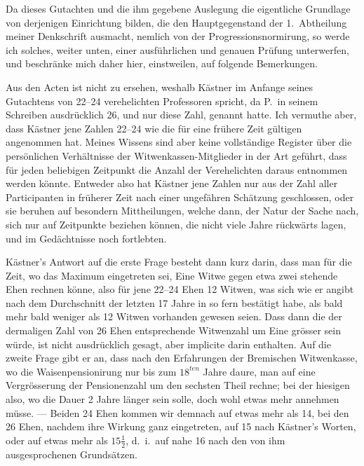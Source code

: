 \documentclass[12pt,a4paper]{article}
\begin{document}
Da dieses Gutachten und die ihm gegebene Auslegung die eigentliche Grundlage von derjenigen Einrichtung bilden, die den Hauptgegenstand der 1.\ Abtheilung meiner Denkschrift ausmacht, nemlich von der Progressionsnormirung, so werde ich solches, weiter unten, einer ausf\"uhrlichen und genauen Pr\"ufung unterwerfen, und beschr\"anke mich daher hier, einstweilen, auf folgende Bemerkungen.

Aus den Acten ist nicht zu ersehen, weshalb K\"astner im Anfange seines Gutachtens von 22--24 verehelichten Professoren spricht, da P.\ in seinem Schreiben ausdr\"ucklich 26, und nur diese Zahl, genannt hatte. Ich vermuthe aber, dass K\"astner jene Zahlen 22--24 wie die f\"ur eine fr\"uhere Zeit g\"ultigen angenommen hat. Meines Wissens sind aber keine vollst\"andige Register \"uber die pers\"onlichen Verh\"altnisse der Witwenkassen-Mitglieder in der Art gef\"uhrt, dass f\"ur jeden beliebigen Zeitpunkt die Anzahl der Verehelichten daraus entnommen werden k\"onnte. Entweder also hat K\"astner jene Zahlen nur aus der Zahl aller Participanten in fr\"uherer Zeit nach einer ungef\"ahren Sch\"atzung geschlossen, oder sie beruhen auf besondern Mittheilungen, welche dann, der Natur der Sache nach, sich nur auf Zeitpunkte beziehen k\"onnen, die nicht viele Jahre r\"uckw\"arts lagen, und im Ged\"achtnisse noch fortlebten.

K\"astner's Antwort auf die erste Frage besteht dann kurz darin, dass man f\"ur die Zeit, wo das Maximum eingetreten sei, Eine Witwe gegen etwa zwei stehende Ehen rechnen k\"onne, also f\"ur jene 22--24 Ehen 12 Witwen, was sich wie er angibt nach dem Durchschnitt der letzten 17 Jahre in so fern best\"atigt habe, als bald mehr bald weniger als 12 Witwen vorhanden gewesen seien. Dass dann die der dermaligen Zahl von 26 Ehen entsprechende Witwenzahl um Eine gr\"osser sein w\"urde, ist nicht ausdr\"ucklich gesagt, aber implicite darin enthalten. Auf die zweite Frage gibt er an, dass nach den Erfahrungen der Bremischen Witwenkasse, wo die Waisenpensionirung nur bis zum $18^{ten}$ Jahre daure, man auf eine Vergr\"osserung der Pensionenzahl um den sechsten Theil rechne; bei der hiesigen also, wo die Dauer 2 Jahre l\"anger sein solle, doch wohl etwas mehr annehmen m\"usse. --- Beiden 24 Ehen kommen wir demnach auf etwas mehr als 14, bei den 26 Ehen, nachdem ihre Wirkung ganz eingetreten, auf 15 nach K\"astner's Worten, oder auf etwas mehr als $15\frac{1}{2}$, d.\ i.\ auf nahe 16 nach den von ihm ausgesprochenen Grunds\"atzen.
\end{document}
